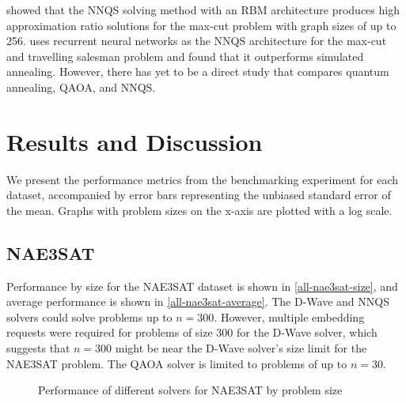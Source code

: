 showed that the NNQS solving method with an RBM architecture produces high approximation ratio solutions for the max-cut problem with graph sizes of up to 256.  uses recurrent neural networks as the NNQS architecture for the max-cut and travelling salesman problem and found that it outperforms simulated annealing. However, there has yet to be a direct study that compares quantum annealing, QAOA, and NNQS.

\section{Results and Discussion}
We present the performance metrics from the benchmarking experiment for each dataset, accompanied by error bars representing the unbiased standard error of the mean. Graphs with problem sizes on the x-axis are plotted with a log scale.

\subsection{NAE3SAT}
Performance by size for the NAE3SAT dataset is shown in \autoref{all-nae3sat-size}, and average performance is shown in \autoref{all-nae3sat-average}. The D-Wave and NNQS solvers could solve problems up to $n=300$. However, multiple embedding requests were required for problems of size $300$ for the D-Wave solver, which suggests that $n=300$ might be near the D-Wave solver's size limit for the NAE3SAT problem. The QAOA solver is limited to problems of up to $n=30$.

\begin{figure}[!htb]
    \centering
    \caption{Performance of different solvers for NAE3SAT by problem size}
    \label{all-nae3sat-size}
\end{figure}

